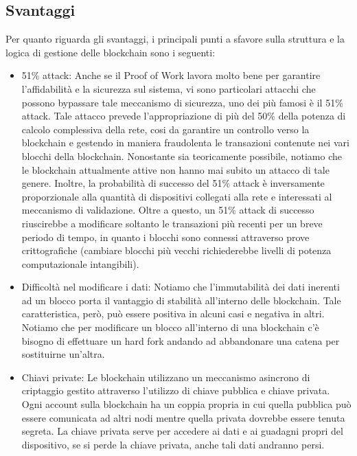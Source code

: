 \subsection{Svantaggi}
Per quanto riguarda gli svantaggi, i principali punti a sfavore sulla struttura e la logica di gestione delle  blockchain sono i seguenti:
\begin{itemize}
    \item 51\% attack: Anche se il Proof of Work lavora molto bene per garantire l'affidabilità e la sicurezza sul sistema, vi sono particolari attacchi che possono bypassare tale meccanismo di sicurezza, uno dei più famosi è il 51\% attack. Tale attacco prevede l'appropriazione di più del 50\% della potenza di calcolo complessiva della rete, cosi da garantire un controllo verso la blockchain e gestendo in maniera fraudolenta le transazioni contenute nei vari blocchi della blockchain. Nonostante sia teoricamente possibile, notiamo che le blockchain attualmente attive non hanno mai subito un attacco di tale genere. Inoltre, la probabilità di successo del 51\% attack è inversamente proporzionale alla quantità di dispositivi collegati alla rete e interessati al meccanismo di validazione. Oltre a questo, un 51\% attack di successo riuscirebbe a modificare soltanto le transazioni più recenti per un breve periodo di tempo, in quanto i blocchi sono connessi attraverso prove crittografiche (cambiare blocchi più vecchi richiederebbe livelli di potenza computazionale intangibili).
    \item Difficoltà nel modificare i dati: Notiamo che l'immutabilità dei dati inerenti ad un blocco porta il vantaggio di stabilità all'interno delle blockchain. Tale caratteristica, però, può essere positiva in alcuni casi e negativa in altri. Notiamo che per modificare un blocco all'interno di una blockchain c'è bisogno di effettuare un hard fork andando ad abbandonare una catena per sostituirne un'altra. 
    \item Chiavi private: Le blockchain utilizzano un meccanismo asincrono di criptaggio gestito attraverso l'utilizzo di chiave pubblica e chiave privata. Ogni account sulla blockchain ha un coppia propria in cui quella pubblica può essere comunicata ad altri nodi mentre quella privata dovrebbe essere tenuta segreta. La chiave privata serve per accedere ai dati e ai guadagni propri del dispositivo, se si perde la chiave privata, anche tali dati andranno persi.

\end{itemize}
